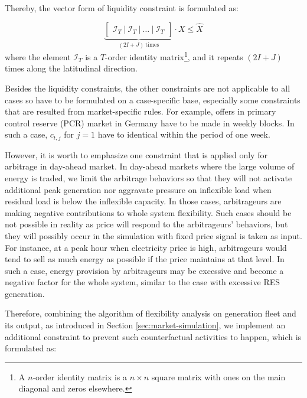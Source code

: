Thereby, the vector form of liquidity constraint is formulated as:
 
\begin{equation}
\label{eq:liquidity}
	\underbrace{\begin{bmatrix}
	\mathcal{I}_T~|~\mathcal{I}_T~|~ \dots~|~\mathcal{I}_T 
	\end{bmatrix}}_{(2I+J)~\text{times}}\cdot X \leq \hat{X}
\end{equation}
where the element $\mathcal{I}_T$ is a $T$-order identity matrix\footnote{A $n$-order identity matrix is a $n \times n$ square matrix with ones on the main diagonal and zeros elsewhere.}, and it repeats $(2I+J)$ times along the latitudinal direction.

Besides the liquidity constraints, the other constraints are not applicable to all cases so have to be formulated on a case-specific base, especially some constraints that are resulted from market-specific rules. For example, offers in primary control reserve (PCR) market in Germany have to be made in weekly blocks. In such a case, $c_{t,j}$ for $j =1$ have to identical within the period of one week.

However, it is worth to emphasize one constraint that is applied only for arbitrage in day-ahead market. In day-ahead markets where the large volume of energy is traded, we limit the arbitrage behaviors so that they will not activate additional peak generation nor aggravate pressure on inflexible load when residual load is below the inflexible capacity. In those cases, arbitrageurs are making negative contributions to whole system flexibility. Such cases should be not possible in reality as price will respond to the arbitrageurs' behaviors, but they will possibly occur in the simulation with fixed price signal is taken as input. For instance, at a peak hour when electricity price is high, arbitrageurs would tend to sell as much energy as possible if the price maintains at that level. In such a case, energy provision by arbitrageurs may be excessive and become a negative factor for the whole system, similar to the case with excessive RES generation.

Therefore, combining the algorithm of flexibility analysis on generation fleet and its output, as introduced in Section \ref{sec:market-simulation}, we implement an additional constraint to prevent such counterfactual activities to happen, which is formulated as:

